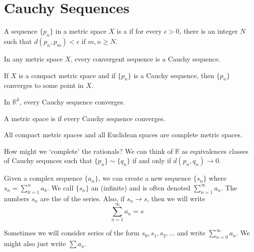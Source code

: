 \documentclass{mathnotes}
\newcommand{\rr}{\mathbb{R}}
\begin{document}
\section*{Cauchy Sequences}

\begin{bdefi}
  A sequence $\{p_n\}$ in a metric space $X$ is a  if
  for every $\epsilon>0$, there is an integer $N$ such that
  $d(p_n,p_m)<\epsilon$ if $m,n\ge N$.
\end{bdefi}

\begin{prop}
  In any metric space $X$, every convergent sequence is a Cauchy sequence.
\end{prop}

\begin{prop}
  If $X$ is a compact metric space and if $\{p_n\}$ is a Cauchy sequence, then
  $\{p_n\}$ converges to some point in $X$.
\end{prop}

\begin{prop}
  In $\rr^k$, every Cauchy sequence converges.
\end{prop}

\begin{defi}
  A metric space is  if every Cauchy sequence converges.
\end{defi}

\begin{prop}
  All compact metric spaces and all Euclidean spaces are complete metric spaces.
\end{prop}

\begin{note}
  How might we `complete' the rationals? We can think of $\rr$ as equivalences
  classes of Cauchy sequnces such that $\{p_n\}\sim\{q_n\}$ if and only if
  $d(p_n,q_n)\to0$.
\end{note}

\begin{bdefi}
  Given a complex sequence $\{a_n\}$, we can create a new sequence $\{s_n\}$
  where $s_n=\sum_{k=1}^na_k$. We call $\{s_n\}$ an (infinite) 
  and is often denoted $\sum_{n=1}^\infty a_n$. The numbers $s_n$ are the
   of the series. Also, if $s_n\to s$, then we will write
  $$\sum_{n=1}^\infty a_n=s$$
\end{bdefi}

\begin{note}
  Sometimes we will consider series of the form $s_0,s_1,s_2,\ldots$ and write
  $\sum_{n=0}^\infty a_n$. We might also just write $\sum a_n$.
\end{note}
\end{document}
